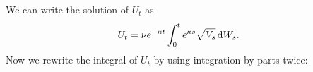 \documentclass{ws-ijfe}
\begin{document}
We can write the solution of $U_t$ as
\begin{align*}
  U_t & = \nu e^{-\kappa t}\int_{0}^{t}e^{\kappa s}\sqrt{V_s}\,\mathrm{d} W_s.
\end{align*}
Now we rewrite the integral of $U_t$ by using integration by parts twice:
\end{document}
